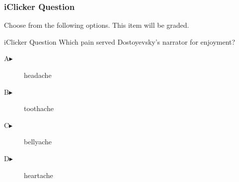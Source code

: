 \begin{frame}
  \frametitle{iClicker Question}
Choose from the following options. This item will be graded.
\begin{block}{iClicker Question}
Which pain served Dostoyevsky's narrator for enjoyment?
\end{block}
\begin{description}
\item[A\hspace{.2in}$\blacktriangleright$] headache
\item[B\hspace{.2in}$\blacktriangleright$] toothache
\item[C\hspace{.2in}$\blacktriangleright$] bellyache
\item[D\hspace{.2in}$\blacktriangleright$] heartache
\end{description}
\end{frame}

